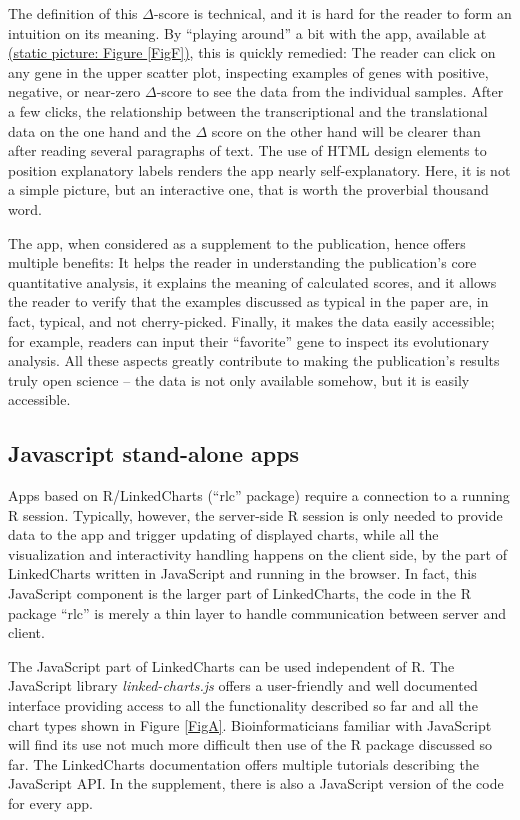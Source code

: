 \documentclass[twocolumn,10pt]{article}
\begin{document}
The definition of this $\Delta$-score is technical, and it is hard for the reader to form an intuition on its meaning. By ``playing around'' a bit with the app, available at \href{https://ex2plorer.kaessmannlab.org/}{(static picture: Figure \ref{FigF})}, this is quickly remedied:  The reader can click on any gene in the upper scatter plot, inspecting examples of genes with positive, negative, or near-zero $\Delta$-score to see the data from the individual samples. After a few clicks, the relationship between the transcriptional and the translational data on the one hand and the $\Delta$ score on the other hand will be clearer than after reading several paragraphs of text. The use of HTML design elements to position explanatory labels renders the app nearly self-explanatory. Here, it is not a simple picture, but an interactive one, that is worth the proverbial thousand word. 

The app, when considered as a supplement to the publication, hence offers multiple benefits: It helps the reader in understanding the publication's core quantitative analysis, it explains the meaning of calculated scores, and it allows the reader to verify that the examples discussed as typical in the paper are, in fact, typical, and not cherry-picked. Finally, it makes the data easily accessible; for example, readers can input their ``favorite'' gene to inspect its evolutionary analysis. All these aspects greatly contribute to making the publication's results truly open science -- the data is not only available somehow, but it is easily accessible.

\subsection{Javascript stand-alone apps}

Apps based on R/LinkedCharts (``rlc'' package) require a connection to a running R session. Typically, however, the server-side R session is only needed to provide data to the app and trigger updating of displayed charts, while all the visualization and interactivity handling happens on the client side, by the part of LinkedCharts written in JavaScript and running in the browser. In fact, this JavaScript component is the larger part of LinkedCharts, the code in the R package ``rlc'' is merely a thin layer to handle communication between server and client.

The JavaScript part of LinkedCharts can be used independent of R. The JavaScript library \emph{linked-charts.js} offers a user-friendly and well documented interface providing access to all the functionality described so far and all the chart types shown in Figure \ref{FigA}. Bioinformaticians familiar with JavaScript will find its use not much more difficult then use of the R package discussed so far. The LinkedCharts documentation offers multiple tutorials  describing the JavaScript API. In the supplement, there is also a JavaScript version of the code for every app.
\end{document}
